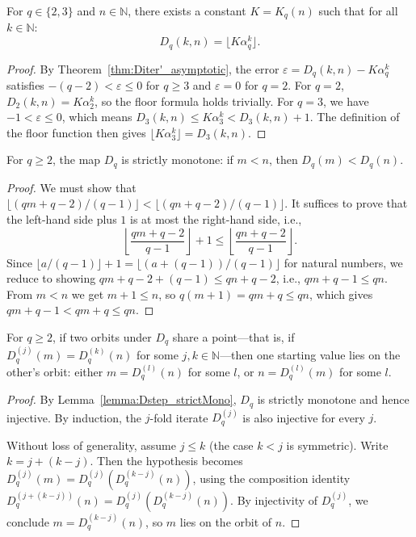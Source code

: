 \begin{corollary}
  \label{cor:Diter'_eq_floor}
  \leanok
  For $q \in \{2, 3\}$ and $n \in \mathbb{N}$, there exists a constant $K = K_q(n)$ such that for all $k \in \mathbb{N}$:
  \[ D_q(k, n) = \lfloor K \alpha_q^k \rfloor. \]
  \begin{proof}
    \leanok
    By Theorem~\ref{thm:Diter'_asymptotic}, the error $\varepsilon = D_q(k, n) - K \alpha_q^k$ satisfies $-(q-2) < \varepsilon \le 0$ for $q \ge 3$ and $\varepsilon = 0$ for $q=2$.
    For $q=2$, $D_2(k, n) = K \alpha_2^k$, so the floor formula holds trivially.
    For $q=3$, we have $-1 < \varepsilon \le 0$, which means $D_3(k, n) \le K \alpha_3^k < D_3(k, n) + 1$.
    The definition of the floor function then gives $\lfloor K \alpha_3^k \rfloor = D_3(k, n)$.
  \end{proof}
\end{corollary}

\begin{lemma}
  \label{lemma:Dstep_strictMono}
  \leanok
  For $q \ge 2$, the map $D_q$ is strictly monotone: if $m < n$, then $D_q(m) < D_q(n)$.
  \begin{proof}
    \leanok
    We must show that $\lfloor (qm + q - 2)/(q-1) \rfloor < \lfloor (qn + q - 2)/(q-1) \rfloor$.
    It suffices to prove that the left-hand side plus $1$ is at most the right-hand side, i.e.,
    \[ \left\lfloor \frac{qm + q - 2}{q-1} \right\rfloor + 1 \le \left\lfloor \frac{qn + q - 2}{q-1} \right\rfloor. \]
    Since $\lfloor a/(q-1) \rfloor + 1 = \lfloor (a + (q-1))/(q-1) \rfloor$ for natural numbers,
    we reduce to showing $qm + q - 2 + (q - 1) \le qn + q - 2$, i.e., $qm + q - 1 \le qn$.
    From $m < n$ we get $m + 1 \le n$, so $q(m+1) = qm + q \le qn$, which gives $qm + q - 1 < qm + q \le qn$.
  \end{proof}
\end{lemma}

\begin{lemma}
  \label{lemma:orbit_shared_point}
  \leanok
  For $q \ge 2$, if two orbits under $D_q$ share a point---that is, if $D_q^{(j)}(m) = D_q^{(k)}(n)$ for some $j, k \in \mathbb{N}$---then one starting value lies on the other's orbit:
  either $m = D_q^{(l)}(n)$ for some $l$, or $n = D_q^{(l)}(m)$ for some $l$.
  \begin{proof}
    \leanok
    By Lemma~\ref{lemma:Dstep_strictMono}, $D_q$ is strictly monotone and hence injective.
    By induction, the $j$-fold iterate $D_q^{(j)}$ is also injective for every $j$.

    Without loss of generality, assume $j \le k$ (the case $k < j$ is symmetric).
    Write $k = j + (k - j)$.
    Then the hypothesis becomes $D_q^{(j)}(m) = D_q^{(j)}(D_q^{(k-j)}(n))$,
    using the composition identity $D_q^{(j+(k-j))}(n) = D_q^{(j)}(D_q^{(k-j)}(n))$.
    By injectivity of $D_q^{(j)}$, we conclude $m = D_q^{(k-j)}(n)$, so $m$ lies on the orbit of $n$.
  \end{proof}
\end{lemma}
